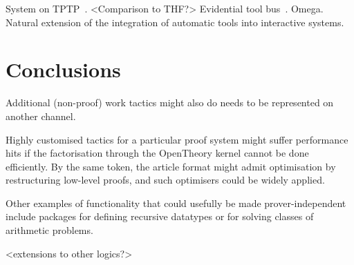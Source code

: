 \documentclass{llncs}
\begin{document}
System on TPTP~\cite{DBLP:conf/lpar/Sutcliffe10}.
<Comparison to THF?>
Evidential tool bus~\cite{DBLP:conf/icfem/Rushby05,fk:etb}.
Omega.
Natural extension of the integration of automatic tools into interactive systems.

\section{Conclusions}
Additional (non-proof) work tactics might also do needs to be represented on another channel.

Highly customised tactics for a particular proof system might suffer performance hits if the factorisation through the OpenTheory kernel cannot be done efficiently.
By the same token, the article format might admit optimisation by restructuring low-level proofs, and such optimisers could be widely applied.

Other examples of functionality that could usefully be made prover-independent include packages for defining recursive datatypes or for solving classes of arithmetic problems.

<extensions to other logics?>



\end{document}

